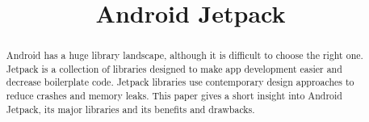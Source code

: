 \documentclass[conference]{IEEEtran}
\begin{document}
\title{Android Jetpack}

\author{
    \and
}

\maketitle

\begin{abstract}
Android has a huge library landscape, although it is difficult to choose the right one. Jetpack is a collection of libraries designed to make app development easier and decrease boilerplate code. Jetpack libraries use contemporary design approaches to reduce crashes and memory leaks. This paper gives a short insight into Android Jetpack, its major libraries and its benefits and drawbacks.
\end{abstract}






\graphicspath{{images/}}


\end{document}
